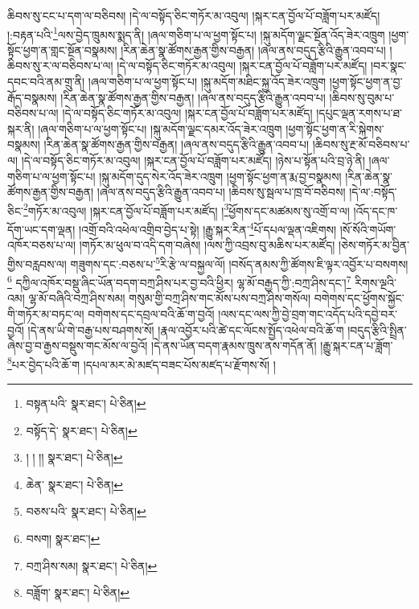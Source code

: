 ཆིབས་སུ་ངང་པ་དག་ལ་བཅིབས། །དེ་ལ་བསྟོད་ཅིང་གཏོར་མ་འབུལ། །སྐར་ངན་བྱོལ་པོ་བཟློག་པར་མཛོད། །:བརྟན་པའི་\footnote{བསྟན་པའི་  སྣར་ཐང་།  པེ་ཅིན། }ལས་བྱེད་ཁྲུམས་སྨད་ནི། །ཞལ་གཅིག་པ་ལ་ཕྱག་སྟོང་པ། །སྐུ་མདོག་ལྗང་སྔོན་འོད་ཟེར་འཁྲུག །ཕྱག་སྟོང་ཕྱག་ན་གླང་སྔོན་བསྣམས། །རིན་ཆེན་སྣ་ཚོགས་རྒྱན་གྱིས་བརྒྱན། །ཞལ་ནས་བདུད་རྩིའི་རྒྱུན་འབབ་པ། །ཆིབས་སུ་ར་ལ་བཅིབས་པ་ལ། །དེ་ལ་བསྟོད་ཅིང་གཏོར་མ་འབུལ། །སྐར་ངན་བྱོལ་པོ་བཟློག་པར་མཛོད། །བར་སྣང་དབང་བའི་ནམ་གྲུ་ནི། །ཞལ་གཅིག་པ་ལ་ཕྱག་སྟོང་པ། །སྐུ་མདོག་མཐིང་སྐྱ་འོད་ཟེར་འཁྲུག །ཕྱག་སྟོང་ཕྱག་ན་བྱ་རྒོད་བསྣམས། །རིན་ཆེན་སྣ་ཚོགས་རྒྱན་གྱིས་བརྒྱན། །ཞལ་ནས་བདུད་རྩིའི་རྒྱུན་འབབ་པ། །ཆིབས་སུ་བུམ་པ་བཅིབས་པ་ལ། །དེ་ལ་བསྟོད་ཅིང་གཏོར་མ་འབུལ། །སྐར་ངན་བྱོལ་པོ་བཟློག་པར་མཛོད། །དཔུང་ལྡན་རགས་པ་ཐ་སྐར་ནི། །ཞལ་གཅིག་པ་ལ་ཕྱག་སྟོང་པ། །སྐུ་མདོག་ལྗང་དམར་འོད་ཟེར་འཁྲུག །ཕྱག་སྟོང་ཕྱག་ན་རི་སྐེགས་བསྣམས། །རིན་ཆེན་སྣ་ཚོགས་རྒྱན་གྱིས་བརྒྱན། །ཞལ་ནས་བདུད་རྩིའི་རྒྱུན་འབབ་པ། །ཆིབས་སུ་རྔ་མོ་བཅིབས་པ་ལ། །དེ་ལ་བསྟོད་ཅིང་གཏོར་མ་འབུལ། །སྐར་ངན་བྱོལ་པོ་བཟློག་པར་མཛོད། །ཉེས་པ་སྟོན་པའི་བྲ་ཉེ་ནི། །ཞལ་གཅིག་པ་ལ་ཕྱག་སྟོང་པ། །སྐུ་མདོག་དུད་སེར་འོད་ཟེར་འཁྲུག །ཕྱག་སྟོང་ཕྱག་ན་རྨ་བྱ་བསྣམས། །རིན་ཆེན་སྣ་ཚོགས་རྒྱན་གྱིས་བརྒྱན། །ཞལ་ནས་བདུད་རྩིའི་རྒྱུན་འབབ་པ། །ཆིབས་སུ་སྦལ་པ་ཁྲ་བོ་བཅིབས། །དེ་ལ་:བསྟོད་ཅིང་\footnote{བསྟོད་དེ་  སྣར་ཐང་།  པེ་ཅིན། }གཏོར་མ་འབུལ། །སྐར་ངན་བྱོལ་པོ་བཟློག་པར་མཛོད། །\footnote{། ། །།  སྣར་ཐང་།  པེ་ཅིན། }ཕྱོགས་དང་མཚམས་སུ་འགྲོ་བ་ལ། །འོད་དང་ཁ་དོག་ཡང་དག་ལྡན། །འགྲོ་བའི་འཕེལ་འགྲིབ་བྱེད་པ་སྟེ། །རྒྱུ་སྐར་རིན་\footnote{ཆེན་  སྣར་ཐང་།  པེ་ཅིན། }པོ་དཔལ་ལྡན་འཇིགས། །སོ་སོའི་གཡོག་འཁོར་བཅས་པ་ལ། །གཏོར་མ་ཕུལ་བ་འདི་དག་བཞེས། །ལས་ཀྱི་འབྲས་བུ་མཆིས་པར་མཛོད། །ཅེས་གཏོར་མ་བྱིན་གྱིས་བརླབས་ལ། གཟུགས་དང་:བཅས་པ་\footnote{བཅས་པའི་  སྣར་ཐང་།  པེ་ཅིན། }རི་རྩེ་ལ་བསྐྱལ་ལོ། །བསོད་ནམས་ཀྱི་ཚོགས་ཇི་ལྟར་འབྱོར་པ་བསགས།\footnote{བསག།  སྣར་ཐང་། } དཀྱིལ་འཁོར་བསྡུ་ཞིང་ཡོན་བདག་བཀྲ་ཤིས་པར་བྱ་བའི་ཕྱིར། ལྷ་མོ་བརྒྱད་ཀྱི་:བཀྲ་ཤིས་དང་།\footnote{བཀྲ་ཤིས་སམ།  སྣར་ཐང་།  པེ་ཅིན། } རིགས་ལྔའི་འམ། ལྷ་མོ་བཞིའི་བཀྲ་ཤིས་སམ། གསུམ་གྱི་བཀྲ་ཤིས་གང་མོས་པས་བཀྲ་ཤིས་གསོལ། བགེགས་དང་ཕྱོགས་སྐྱོང་གི་གཏོར་མ་བཏང་ལ། བགེགས་དང་དབྲལ་བའི་ཆོ་ག་བྱའོ། །ལས་དང་ལས་ཀྱི་བྱེ་བྲག་གང་འདོད་པའི་དབྱེ་བར་བྱའོ། །དེ་ནས་ཡི་གེ་བརྒྱ་པས་བཤགས་སོ། །རྣལ་འབྱོར་པའི་ཚེ་དང་ལོངས་སྤྱོད་འཕེལ་བའི་ཆོ་ག །བདུད་རྩིའི་སྤྲིན་ཞེས་བྱ་བ་རྒྱས་བསྡུས་གང་མོས་ལ་བྱའོ། །དེ་ནས་ཡོན་བདག་རྣམས་ཁྲུས་ནས་གདོན་ནོ། །རྒྱུ་སྐར་ངན་པ་ཟློག་\footnote{བཟློག་  སྣར་ཐང་།  པེ་ཅིན། }པར་བྱེད་པའི་ཆོ་ག །དཔལ་མར་མེ་མཛད་བཟང་པོས་མཛད་པ་རྫོགས་སོ། ། 